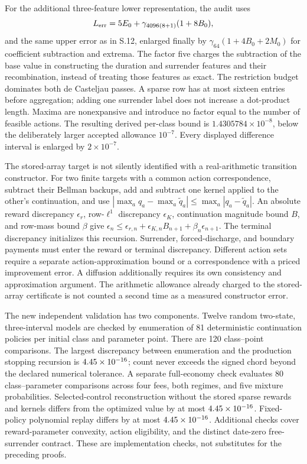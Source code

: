 For the additional three-feature lower representation, the audit uses
\[
 L_{\rm err}=5E_0+\gamma_{4096(8+1)}(1+8B_0),
\]
and the same upper error as in S.12, enlarged finally by
$\gamma_{64}(1+4B_0+2M_0)$ for coefficient subtraction and extrema. The factor five charges the subtraction of the base value in constructing the duration and surrender features and their recombination, instead of treating those features as exact. The restriction budget dominates both de Casteljau passes. A sparse row has at most sixteen entries before aggregation; adding one surrender label does not increase a dot-product length. Maxima are nonexpansive and introduce no factor equal to the number of feasible actions. The resulting derived per-class bound is $1.4305784\times10^{-8}$, below the deliberately larger accepted allowance $10^{-7}$. Every displayed difference interval is enlarged by $2\times10^{-7}$.

The stored-array target is not silently identified with a real-arithmetic transition constructor. For two finite targets with a common action correspondence, subtract their Bellman backups, add and subtract one kernel applied to the other's continuation, and use
$|\max_a q_a-\max_a\widetilde q_a|\leq\max_a|q_a-\widetilde q_a|$.
An absolute reward discrepancy $\epsilon_r$, row-$\ell^1$ discrepancy $\epsilon_K$, continuation magnitude bound $B$, and row-mass bound $\beta$ give
$\epsilon_n\leq\epsilon_{r,n}+\epsilon_{K,n}B_{n+1}+\beta_n\epsilon_{n+1}$.
The terminal discrepancy initializes this recursion. Surrender, forced-discharge, and boundary payments must enter the reward or terminal discrepancy. Different action sets require a separate action-approximation bound or a correspondence with a priced improvement error. A diffusion additionally requires its own consistency and approximation argument. The arithmetic allowance already charged to the stored-array certificate is not counted a second time as a measured constructor error.

The new independent validation has two components. Twelve random two-state, three-interval models are checked by enumeration of 81 deterministic continuation policies per initial class and parameter point. There are 120 class--point comparisons. The largest discrepancy between enumeration and the production stopping recursion is $4.45\times10^{-16}$; count never exceeds the signed chord beyond the declared numerical tolerance. A separate full-economy check evaluates 80 class--parameter comparisons across four fees, both regimes, and five mixture probabilities. Selected-control reconstruction without the stored sparse rewards and kernels differs from the optimized value by at most $4.45\times10^{-16}$. Fixed-policy polynomial replay differs by at most $4.45\times10^{-16}$. Additional checks cover reward-parameter convexity, action eligibility, and the distinct date-zero free-surrender contract. These are implementation checks, not substitutes for the preceding proofs.

